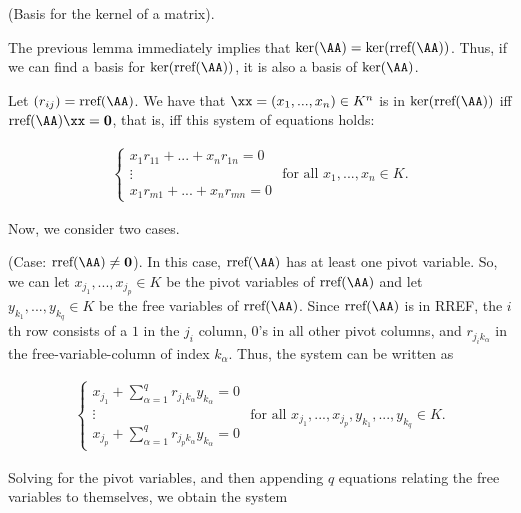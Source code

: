 \begin{deriv}
    (Basis for the kernel of a matrix).

    The previous lemma immediately implies that $\ker(\AA) = \ker(\rref(\AA))$. Thus, if we can find a basis for $\ker(\rref(\AA))$, it is also a basis of $\ker(\AA)$.

    Let $(r_{ij}) = \rref(\AA)$. We have that $\xx = (x_1, ..., x_n) \in K^n$ is in $\ker(\rref(\AA))$ iff $\rref(\AA) \xx = \mathbf{0}$, that is, iff this system of equations holds:

    \begin{align*}
        \begin{cases}
            x_1 r_{11} + ... + x_n r_{1n} = 0 \\
            \vdots \\
            x_1 r_{m1} + ... + x_n r_{mn} = 0
        \end{cases}
        \text{ for all $x_1, ..., x_n \in K$}.
    \end{align*}

    Now, we consider two cases.
    
    (Case: $\rref(\AA) \neq \mathbf{0}$). In this case, $\rref(\AA)$ has at least one pivot variable. So, we can let $x_{j_1}, ..., x_{j_p} \in K$ be the pivot variables of $\rref(\AA)$ and let $y_{k_1}, ..., y_{k_q} \in K$ be the free variables of $\rref(\AA)$. Since $\rref(\AA)$ is in RREF, the $i$th row consists of a $1$ in the $j_i$ column, $0$'s in all other pivot columns, and $r_{j_i k_\alpha}$ in the free-variable-column of index $k_\alpha$. Thus, the system can be written as
    
    \begin{align*}
        \begin{cases}
            x_{j_1} + \sum_{\alpha = 1}^q r_{j_1 k_\alpha} y_{k_\alpha} = 0 \\
            \vdots \\
            x_{j_p} + \sum_{\alpha = 1}^q r_{j_p k_\alpha} y_{k_\alpha} = 0
        \end{cases}
        \text{ for all $x_{j_1}, ..., x_{j_p}, y_{k_1}, ..., y_{k_q} \in K$}.
    \end{align*}

    Solving for the pivot variables, and then appending $q$ equations relating the free variables to themselves, we obtain the system


\end{deriv}
